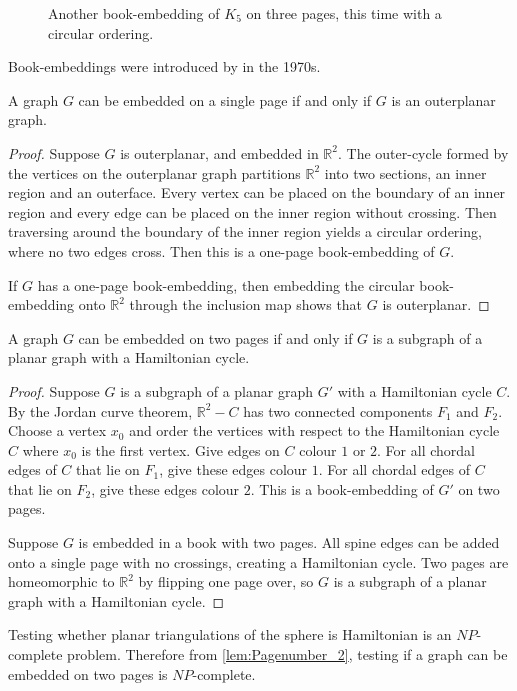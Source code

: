\begin{figure}[h!]
	\centering
	
	\caption[Three-page circular book-embedding of $K_5$]{Another book-embedding of $K_5$ on three pages, this time with a circular ordering.}\label{fig:circular_book-embedding}
\end{figure}

Book-embeddings were introduced by \textcite{kainenRecentResultsTopological1974, ollmannBookThicknessVarious1973} in the 1970s.
\begin{proposition}\label{lem:Pagenumber_1}
	A graph \(G\) can be embedded on a single page if and only if \(G\) is an outerplanar graph.
\end{proposition}
\begin{proof}
	Suppose $G$ is outerplanar, and embedded in $\mathbb{R}^2$. The outer-cycle formed by the vertices on the outerplanar graph partitions $\mathbb{R}^2$ into two sections, an inner region and an outerface. Every vertex can be placed on the boundary of an inner region and every edge can be placed on the inner region without crossing. Then traversing around the boundary of the inner region yields a circular ordering, where no two edges cross. Then this is a one-page book-embedding of $G$. 

	If $G$ has a one-page book-embedding, then embedding the circular book-embedding onto $\mathbb{R}^2$ through the inclusion map shows that $G$ is outerplanar. 
\end{proof}
\begin{proposition}\label{lem:Pagenumber_2}
	A graph \(G\) can be embedded on two pages if and only if \(G\) is a subgraph of a planar graph with a Hamiltonian cycle.
\end{proposition}

\begin{proof}
	Suppose $G$ is a subgraph of a planar graph $G'$ with a Hamiltonian cycle $C$. By the Jordan curve theorem, $\mathbb{R}^2 - C$ has two connected components $F_1$ and $F_2$. Choose a vertex $x_0$ and order the vertices with respect to the Hamiltonian cycle $C$ where $x_0$ is the first vertex. Give edges on $C$ colour $1$ or $2$. For all chordal edges of $C$ that lie on $F_1$, give these edges colour $1$. For all chordal edges of $C$ that lie on $F_2$, give these edges colour $2$. This is a book-embedding of $G'$ on two pages. 

	Suppose $G$ is embedded in a book with two pages. All spine edges can be added onto a single page with no crossings, creating a Hamiltonian cycle. Two pages are homeomorphic to $\mathbb{R}^2$ by flipping one page over, so $G$ is a subgraph of a planar graph with a Hamiltonian cycle. 
\end{proof}
Testing whether planar triangulations of the sphere is Hamiltonian is an $NP$-complete problem. Therefore from \cref{lem:Pagenumber_2}, testing if a graph can be embedded on two pages is $NP$-complete. 

